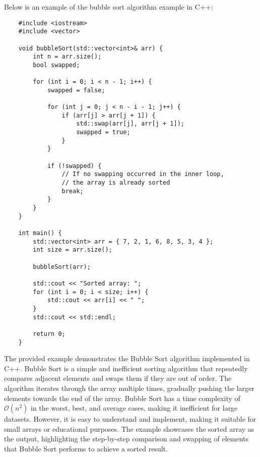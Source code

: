 \begin{solution}
    Below is an example of the bubble sort algorithm example in C++:

    \horizontalline

    \begin{verbatim}
    #include <iostream>
    #include <vector>
    
    void bubbleSort(std::vector<int>& arr) {
        int n = arr.size();
        bool swapped;
    
        for (int i = 0; i < n - 1; i++) {
            swapped = false;
    
            for (int j = 0; j < n - i - 1; j++) {
                if (arr[j] > arr[j + 1]) {
                    std::swap(arr[j], arr[j + 1]);
                    swapped = true;
                }
            }
    
            if (!swapped) {
                // If no swapping occurred in the inner loop, 
                // the array is already sorted
                break;
            }
        }
    }
    
    int main() {
        std::vector<int> arr = { 7, 2, 1, 6, 8, 5, 3, 4 };
        int size = arr.size();
    
        bubbleSort(arr);
    
        std::cout << "Sorted array: ";
        for (int i = 0; i < size; i++) {
            std::cout << arr[i] << " ";
        }
        std::cout << std::endl;
    
        return 0;
    }
    \end{verbatim}

    \horizontalline

    The provided example demonstrates the Bubble Sort algorithm implemented in C++. Bubble Sort is a simple and inefficient sorting algorithm that repeatedly compares adjacent elements and swaps them if they are out of order. The algorithm iterates through the array multiple times, gradually pushing the larger elements towards the end of the array.
    Bubble Sort has a time complexity of $\mathcal{O}(n^2)$ in the worst, best, and average cases, making it inefficient for large datasets. However, it is easy to understand and implement, making it suitable for small arrays or educational purposes. The example showcases the sorted array as the output, highlighting the step-by-step comparison 
    and swapping of elements that Bubble Sort performs to achieve a sorted result.
\end{solution}

